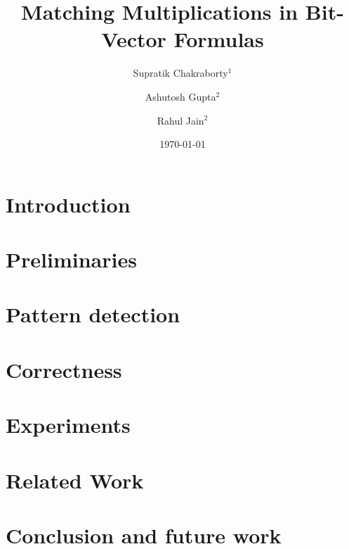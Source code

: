 \documentclass[draft]{llncs}
\begin{document}
\title{Matching Multiplications in Bit-Vector Formulas}

\author{Supratik Chakraborty$^1$ \and Ashutosh Gupta$^2$ \and Rahul Jain$^2$}


\date{\today}

\maketitle
\begin{abstract}

\end{abstract}
%
\section{Introduction}
\label{sec:intro}


\section{Preliminaries}
\label{sec:prelim}


\section{Pattern detection}
\label{sec:pattern}


\section{Correctness}
\label{sec:correct}


\section{Experiments}
\label{sec:experiments}



 \section{Related Work}
 \label{sec:related}
 

\section{Conclusion and future work}
\label{sec:conclusion}




\end{document}
